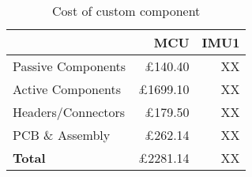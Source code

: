 \begin{table}[htbp]
  \centering
  \caption{Cost of custom component}
  \label{tab:aggregated-cost}
  \begin{tabular}{@{} l r r @{}}
    \toprule
    \textbf{}         & \textbf{MCU} & \textbf{IMU1}\\ 
    \midrule
    Passive Components        & £140.40  & XX\\
    Active Components         & £1699.10 & XX\\
    Headers/Connectors        & £179.50  & XX\\
    PCB \& Assembly           & £262.14  & XX\\
    \midrule
    \textbf{Total}            & £2281.14 & XX\\
    \bottomrule
  \end{tabular}
\end{table}
